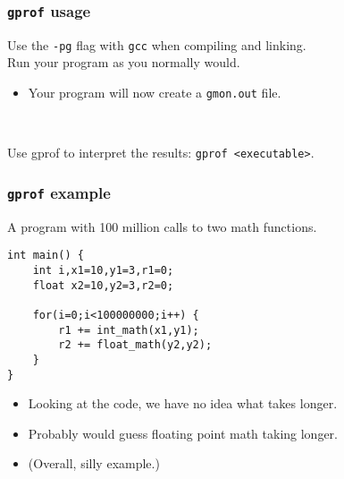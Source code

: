 \documentclass[aspectratio=43]{beamer}
\newenvironment{changemargin}[1]{%
  \begin{list}{}{%
    \setlength{\topsep}{0pt}%
    \setlength{\leftmargin}{#1}%
    \setlength{\rightmargin}{1em}
    \setlength{\listparindent}{\parindent}%
    \setlength{\itemindent}{\parindent}%
    \setlength{\parsep}{\parskip}%
  }%
  \item[]}{\end{list}}
\begin{document}
\begin{frame}
  \frametitle{{\tt gprof} usage}

  \begin{changemargin}{2cm}
    Use the {\tt -pg} flag with {\tt gcc} when compiling and linking.\\[1em]
    Run your program as you normally would.
      \begin{itemize}
        \item Your program will now create a {\tt gmon.out} file.
      \end{itemize}
~\\
    \item Use gprof to interpret the results: {\tt gprof <executable>}.
  \end{changemargin}
\end{frame}

\begin{frame}[fragile]
  \frametitle{{\tt gprof} example}

  \begin{changemargin}{1.5cm}
    A program with 100 million calls to two math functions.

  \begin{lstlisting}
int main() {
    int i,x1=10,y1=3,r1=0;
    float x2=10,y2=3,r2=0;

    for(i=0;i<100000000;i++) {
        r1 += int_math(x1,y1);
        r2 += float_math(y2,y2);
    }
}
  \end{lstlisting}

  \begin{itemize}
    \item Looking at the code, we have no idea what takes longer.
    \item Probably would guess floating point math taking longer.
    \item (Overall, silly example.)
  \end{itemize}
  \end{changemargin}
\end{frame}
\end{document}
